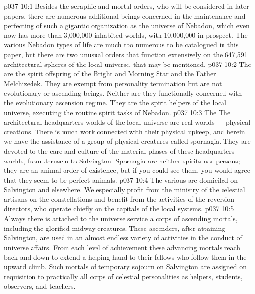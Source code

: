 \vs p037 10:1 Besides the seraphic and mortal orders, who will be considered in later papers, there are numerous additional beings concerned in the maintenance and perfecting of such a gigantic organization as the universe of Nebadon, which even now has more than 3,000,000 inhabited worlds, with 10,000,000 in prospect. The various Nebadon types of life are much too numerous to be catalogued in this paper, but there are two unusual orders that function extensively on the 647,591 architectural spheres of the local universe, that may be mentioned.
\vs p037 10:2 \pc The  are the spirit offspring of the Bright and Morning Star and the Father Melchizedek. They are exempt from personality termination but are not evolutionary or ascending beings. Neither are they functionally concerned with the evolutionary ascension regime. They are the spirit helpers of the local universe, executing the routine spirit tasks of Nebadon.
\vs p037 10:3 \pc The  The architectural headquarters worlds of the local universe are real worlds --- physical creations. There is much work connected with their physical upkeep, and herein we have the assistance of a group of physical creatures called spornagia. They are devoted to the care and culture of the material phases of these headquarters worlds, from Jerusem to Salvington. Spornagia are neither spirits nor persons; they are an animal order of existence, but if you could see them, you would agree that they seem to be perfect animals.
\vs p037 10:4 \pc The various  are domiciled on Salvington and elsewhere. We especially profit from the ministry of the celestial artisans on the constellations and benefit from the activities of the reversion directors, who operate chiefly on the capitals of the local systems.
\vs p037 10:5 Always there is attached to the universe service a corps of ascending mortals, including the glorified midway creatures. These ascenders, after attaining Salvington, are used in an almost endless variety of activities in the conduct of universe affairs. From each level of achievement these advancing mortals reach back and down to extend a helping hand to their fellows who follow them in the upward climb. Such mortals of temporary sojourn on Salvington are assigned on requisition to practically all corps of celestial personalities as helpers, students, observers, and teachers.
